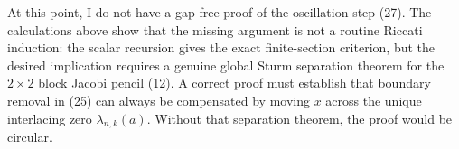 \documentclass[11pt]{article}
\begin{document}
At this point, I do not have a gap-free proof of the oscillation step (27).  The calculations above show that the missing argument is not a routine Riccati induction: the scalar recursion gives the exact finite-section criterion, but the desired implication requires a genuine global Sturm separation theorem for the \(2\times2\) block Jacobi pencil (12).  A correct proof must establish that boundary removal in (25) can always be compensated by moving \(x\) across the unique interlacing zero \(\lambda_{n,k}(a)\).  Without that separation theorem, the proof would be circular.
\end{document}
